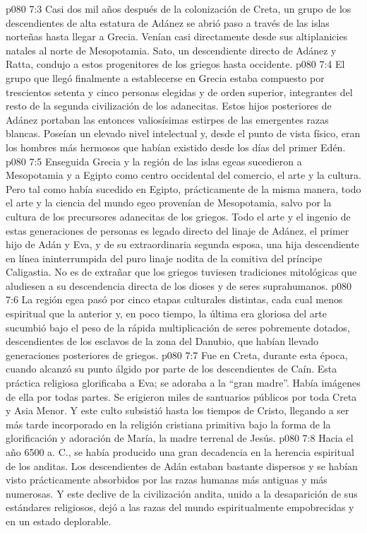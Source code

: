 \vs p080 7:3 Casi dos mil años después de la colonización de Creta, un grupo de los descendientes de alta estatura de Adánez se abrió paso a través de las islas norteñas hasta llegar a Grecia. Venían casi directamente desde sus altiplanicies natales al norte de Mesopotamia. Sato, un descendiente directo de Adánez y Ratta, condujo a estos progenitores de los griegos hasta occidente.
\vs p080 7:4 El grupo que llegó finalmente a establecerse en Grecia estaba compuesto por trescientos setenta y cinco personas elegidas y de orden superior, integrantes del resto de la segunda civilización de los adanecitas. Estos hijos posteriores de Adánez portaban las entonces valiosísimas estirpes de las emergentes razas blancas. Poseían un elevado nivel intelectual y, desde el punto de vista físico, eran los hombres más hermosos que habían existido desde los días del primer Edén.
\vs p080 7:5 \pc Enseguida Grecia y la región de las islas egeas sucedieron a Mesopotamia y a Egipto como centro occidental del comercio, el arte y la cultura. Pero tal como había sucedido en Egipto, prácticamente de la misma manera, todo el arte y la ciencia del mundo egeo provenían de Mesopotamia, salvo por la cultura de los precursores adanecitas de los griegos. Todo el arte y el ingenio de estas generaciones de personas es legado directo del linaje de Adánez, el primer hijo de Adán y Eva, y de su extraordinaria segunda esposa, una hija descendiente en línea ininterrumpida del puro linaje nodita de la comitiva del príncipe Caligastia. No es de extrañar que los griegos tuviesen tradiciones mitológicas que aludiesen a su descendencia directa de los dioses y de seres suprahumanos.
\vs p080 7:6 La región egea pasó por cinco etapas culturales distintas, cada cual menos espiritual que la anterior y, en poco tiempo, la última era gloriosa del arte sucumbió bajo el peso de la rápida multiplicación de seres pobremente dotados, descendientes de los esclavos de la zona del Danubio, que habían llevado generaciones posteriores de griegos.
\vs p080 7:7 Fue en Creta, durante esta época, cuando alcanzó su punto álgido  por parte de los descendientes de Caín. Esta práctica religiosa glorificaba a Eva; se adoraba a la “gran madre”. Había imágenes de ella por todas partes. Se erigieron miles de santuarios públicos por toda Creta y Asia Menor. Y este culto subsistió hasta los tiempos de Cristo, llegando a ser más tarde incorporado en la religión cristiana primitiva bajo la forma de la glorificación y adoración de María, la madre terrenal de Jesús.
\vs p080 7:8 \pc Hacia el año 6500 a. C., se había producido una gran decadencia en la herencia espiritual de los anditas. Los descendientes de Adán estaban bastante dispersos y se habían visto prácticamente absorbidos por las razas humanas más antiguas y más numerosas. Y este declive de la civilización andita, unido a la desaparición de sus estándares religiosos, dejó a las razas del mundo espiritualmente empobrecidas y en un estado deplorable.
